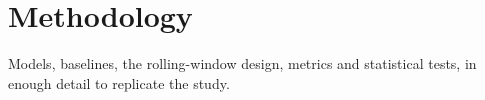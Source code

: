 \chapter{Methodology}

Models, baselines, the rolling-window design, metrics and statistical tests, in enough detail to
replicate the study.

